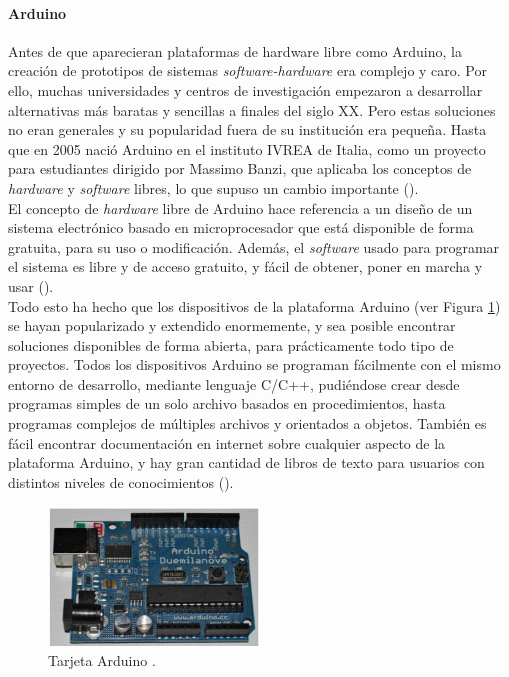 \paragraph{Arduino}

Antes de que aparecieran plataformas de hardware libre como Arduino, la creación de prototipos de sistemas \textit{software-hardware} era complejo y caro. Por ello, muchas universidades y centros de investigación empezaron a desarrollar alternativas más baratas y sencillas a finales del siglo XX. Pero estas soluciones no eran generales y su popularidad fuera de su institución era pequeña. Hasta que en 2005 nació Arduino en el instituto IVREA de Italia, como un proyecto para estudiantes dirigido por Massimo Banzi, que aplicaba los conceptos de \textit{hardware} y \textit{software} libres, lo que supuso un cambio importante (\cite{MT-01}).\\ 

El concepto de \textit{hardware} libre de Arduino hace referencia a un diseño de un sistema electrónico basado en microprocesador que está disponible de forma gratuita, para su uso o modificación. Además, el \textit{software} usado para programar el sistema es libre y de acceso gratuito, y fácil de obtener, poner en marcha y usar (\cite{MT-02}). \\

Todo esto ha hecho que los dispositivos de la plataforma Arduino (ver Figura \ref{Mtres}) se hayan popularizado y extendido enormemente, y sea posible encontrar soluciones disponibles de forma abierta, para prácticamente todo tipo de proyectos. Todos los dispositivos Arduino se programan fácilmente con el mismo entorno de desarrollo, mediante lenguaje C/C++, pudiéndose crear desde programas simples de un solo archivo basados en procedimientos, hasta programas complejos de múltiples archivos y orientados a objetos. También es fácil encontrar documentación en internet sobre cualquier aspecto de la plataforma Arduino, y hay gran cantidad de libros de texto para usuarios con distintos niveles de conocimientos (\cite{MT-03}). \\


%
\begin{figure}[H]
\centering
\includegraphics[width=0.5\textwidth]{marco/fig3.jpg}
\caption{Tarjeta Arduino \cite{MT-03}. }
\label{Mtres}
\end{figure}
%



